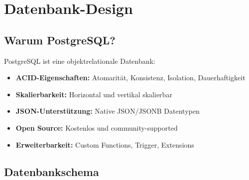 \documentclass[a4paper,12pt]{article}
\begin{document}
\section{Datenbank-Design}

\subsection{Warum PostgreSQL?}

PostgreSQL ist eine objektrelationale Datenbank:
\begin{itemize}
    \item \textbf{ACID-Eigenschaften:} Atomarität, Konsistenz, Isolation, Dauerhaftigkeit
    \item \textbf{Skalierbarkeit:} Horizontal und vertikal skalierbar
    \item \textbf{JSON-Unterstützung:} Native JSON/JSONB Datentypen
    \item \textbf{Open Source:} Kostenlos und community-supported
    \item \textbf{Erweiterbarkeit:} Custom Functions, Trigger, Extensions
\end{itemize}

\subsection{Datenbankschema}
\end{document}
